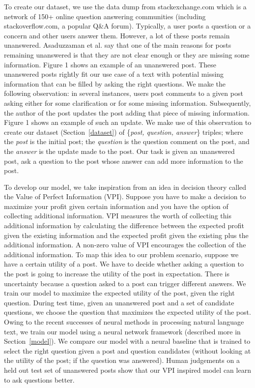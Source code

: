 \documentclass[11pt]{article}
\begin{document}
To create our dataset, we use the data dump from stackexchange.com which is a network of 150+ online question answering communities (including stackoverflow.com, a popular Q\&A forum). Typically, a user posts a question or a concern and other users answer them. However, a lot of these posts remain unanswered. Asaduzzaman et al.  say that one of the main reasons for posts remaining unanswered is that they are not clear enough or they are missing some information. Figure 1 shows an example of an unanswered post. These unanswered posts rightly fit our use case of a text with potential missing information that can be filled by asking the right questions. We make the following observation: in several instances, users post comments to a given post asking either for some clarification or for some missing information. Subsequently, the author of the post updates the post adding that piece of missing information. Figure 1 shows an example of such an update. We make use of this observation to create our dataset (Section~\ref{dataset}) of \{\textit{post, question, answer}\} triples; where the \textit{post} is the initial post; the \textit{question} is the question comment on the post, and the \textit{answer} is the update made to the post. Our task is given an unanswered post, ask a question to the post whose answer can add more information to the post. 

To develop our model, we take inspiration from an idea in decision theory called the Value of Perfect Information (VPI). Suppose you have to make a decision to maximize your profit given certain information and you have the option of collecting additional information. VPI measures the worth of collecting this additional information by calculating the difference between the expected profit given the existing information and the expected profit given the existing plus the additional information. A non-zero value of VPI encourages the collection of the additional information. To map this idea to our problem scenario, suppose we have a certain utility of a post. We have to decide whether asking a question to the post is going to increase the utility of the post in expectation. There is uncertainty because a question asked to a post can trigger different answers. We train our model to maximize the expected utility of the post, given the right question. During test time, given an unanswered post and a set of candidate questions, we choose the question that maximizes the expected utility of the post. Owing to the recent successes of neural methods in processing natural language text, we train our model using a neural network framework (described more in Section~\ref{model}). We compare our model with a neural baseline that is trained to select the right question given a post and question candidates (without looking at the utility of the post; if the question was answered). Human judgements on a held out test set of unanswered posts show that our VPI inspired model can learn to ask questions better.
\end{document}

